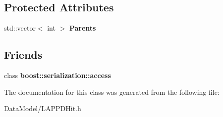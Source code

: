 \subsection*{Protected Attributes}
\begin{DoxyCompactItemize}
\item 
\hypertarget{classMCLAPPDHit_af7f2b72e3e33a3037b5a23b3441c7ce5}{
std::vector$<$ int $>$ {\bfseries Parents}}
\label{classMCLAPPDHit_af7f2b72e3e33a3037b5a23b3441c7ce5}

\end{DoxyCompactItemize}
\subsection*{Friends}
\begin{DoxyCompactItemize}
\item 
\hypertarget{classMCLAPPDHit_ac98d07dd8f7b70e16ccb9a01abf56b9c}{
class {\bfseries boost::serialization::access}}
\label{classMCLAPPDHit_ac98d07dd8f7b70e16ccb9a01abf56b9c}

\end{DoxyCompactItemize}


The documentation for this class was generated from the following file:\begin{DoxyCompactItemize}
\item 
DataModel/LAPPDHit.h\end{DoxyCompactItemize}
